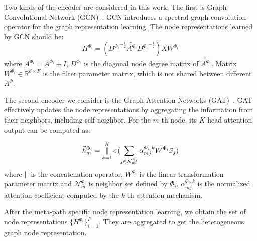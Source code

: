 \documentclass[conference]{IEEEtran}
\newcommand{\concatenate}{\operatornamewithlimits{\|}}
\begin{document}
	Two kinds of the encoder are considered in this work. The first is Graph Convolutional Network (GCN)~\cite{KW17}. 
	GCN introduces a spectral graph convolution operator for the graph representation learning. The node representations learned by GCN should be:
\begin{equation}
		H^{\Phi_i} = ({D^{\Phi_i}}^{-\frac{1}{2}}\tilde{A^{\Phi_i}}{D^{\Phi_i}}^{-\frac{1}{2}})XW^{\Phi_i}
\end{equation}
where $\tilde{A^{\Phi_i}} = A^{\Phi_i} + I$, $D^{\Phi_i}$ is the diagonal node degree matrix of $\tilde{A^{\Phi_i}}$. Matrix $W^{\Phi_i} \in \mathbb{R}^{d \times F}$ is the filter parameter matrix, which is not shared between different $A^{\Phi}$. 
	
	The second encoder we consider is the Graph Attention Networks (GAT)~\cite{VCCRLB18}. GAT effectively updates the node representations by aggregating the information from their neighbors, including self-neighbor. For the $m$-th node, its $K$-head attention output can be computed as:
	
\begin{equation}
		\vec{h}_m^{\Phi_i} = \concatenate_{k=1}^K \sigma(\sum_{j \in \mathcal{N}_{m}^{\Phi_i}}\alpha_{mj}^{\Phi_i,k}W^{\Phi_i} \vec{x}_j)
\end{equation}
where $\concatenate$ is the concatenation operator, $W^{\Phi_i}$ is the 
	linear transformation parameter matrix and $\mathcal{N}_{m}^{\Phi_i}$ is neighbor set defined by $\Phi_i$. $\alpha_{mj}^{\Phi_i,k}$ is the normalized attention coefficient computed by the $k$-th attention mechanism.


After the meta-path specific node representation learning, we obtain the set of node representations $\{H^{\Phi_i}\}_{i=1}^P$. They are aggregated to get the heterogeneous graph node representation. 
\end{document}
